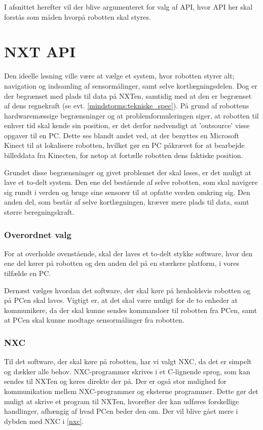 I afsnittet herefter vil der blive argumenteret for valg af API, hvor API her skal forstås som måden hvorpå robotten skal styres.

\section{NXT API}\label{nxt_api}
Den ideelle løsning ville være at vælge et system, hvor robotten styrer alt; navigation og indsamling af sensormålinger, samt selve kortlægningsdelen.
Dog er der begrænset med plads til data på NXTen, samtidig med at den er begrænset af dens regnekraft (se evt. \cref{mindstorms:tekniske_spec}).
På grund af robottens hardwaremæssige begrænsninger og at problemformuleringen siger, at robotten til enhver tid skal kende sin position, er det derfor nødvendigt at 'outsource' visse opgaver til en PC.
Dette ses blandt andet ved, at der benyttes en Microsoft Kinect til at lokalisere robotten, hvilket gør en PC påkrævet for at bearbejde billeddata fra Kinecten, for netop at fortælle robotten dens faktiske position.

Grundet disse begrænsninger og givet problemet der skal løses, er det muligt at lave et to-delt system.
Den ene del bestående af selve robotten, som skal navigere sig rundt i verden og bruge sine sensorer til at opfatte verden omkring sig.
Den anden del, som består af selve kortlægningen, kræver mere plads til data, samt større beregningskraft.

\subsubsection*{Overordnet valg}
For at overholde ovenstående, skal der laves et to-delt stykke software, hvor den ene del kører på robotten og den anden del på en stærkere platform, i vores tilfælde en PC.

Dernæst vælges hvordan det software, der skal køre på henholdsvis robotten og på PCen skal laves.
Vigtigt er, at det skal være muligt for de to enheder at kommunikere, da der skal kunne sendes kommandoer til robotten fra PCen, samt at PCen skal kunne modtage sensormålinger fra robotten.

\subsubsection*{NXC}
Til det software, der skal køre på robotten, har vi valgt NXC, da det er simpelt og dækker alle behov.
NXC-programmer skrives i et C-lignende sprog, som kan sendes til NXTen og køres direkte der på.
Der er også stor mulighed for kommunikation mellem NXC-programmer og eksterne programmer.
Dette gør det muligt at skrive et program til NXTen, hvorefter der kan udføres forskellige handlinger, afhængig af hvad PCen beder den om.
Der vil blive gået mere i dybden med NXC i \cref{nxc}.

